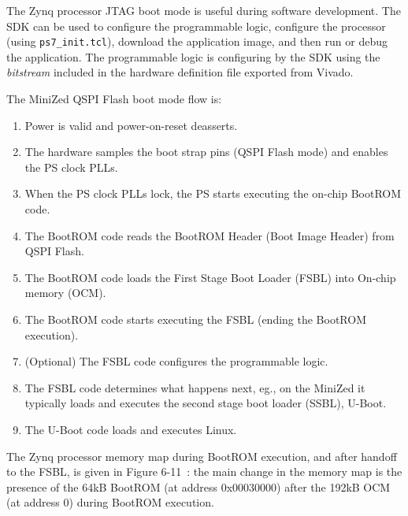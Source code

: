The Zynq processor JTAG boot mode is useful during software development. The SDK can
be used to configure the programmable logic, configure the processor (using \verb+ps7_init.tcl+),
download the application image, and then run or debug the application.
%
The programmable logic is configuring by the SDK using the \emph{bitstream}
included in the hardware definition file exported from Vivado.

The MiniZed QSPI Flash boot mode flow is:
%
\begin{enumerate}
\item Power is valid and power-on-reset deasserts.
\item The hardware samples the boot strap pins (QSPI Flash mode)
and enables the PS clock PLLs.
\item When the PS clock PLLs lock, the PS starts executing the on-chip BootROM code.
\item The BootROM code reads the BootROM Header (Boot Image Header) from QSPI Flash.
\item The BootROM code loads the First Stage Boot Loader (FSBL) into On-chip memory (OCM).
\item The BootROM code starts executing the FSBL (ending the BootROM execution).
\item (Optional) The FSBL code configures the programmable logic.
\item The FSBL code determines what happens next, eg., on the MiniZed it
typically loads and executes the second stage boot loader (SSBL), U-Boot.
\item The U-Boot code loads and executes Linux.
\end{enumerate}
%
The Zynq processor memory map during BootROM execution, and after handoff to the
FSBL, is given in Figure 6-11~\cite{Xilinx_UG585_2018}: the main change in the
memory map is the presence of the 64kB BootROM (at address 0x00030000) after the
192kB OCM (at address 0) during BootROM execution.

